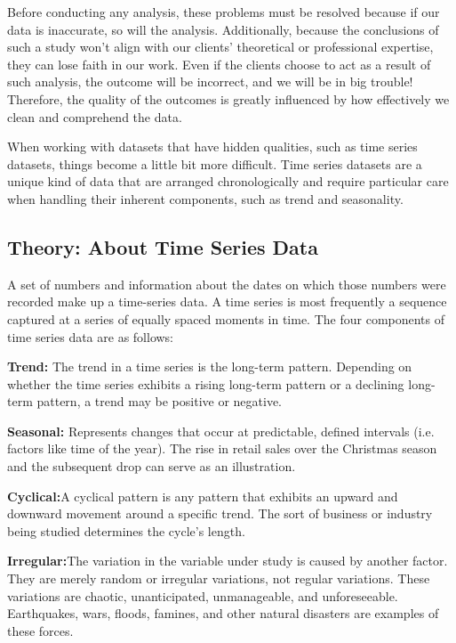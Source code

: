 Before conducting any analysis, these problems must be resolved because if our data is inaccurate, so will the analysis. Additionally, because the conclusions of such a study won't align with our clients' theoretical or professional expertise, they can lose faith in our work. Even if the clients choose to act as a result of such analysis, the outcome will be incorrect, and we will be in big trouble! Therefore, the quality of the outcomes is greatly influenced by how effectively we clean and comprehend the data.

When working with datasets that have hidden qualities, such as time series datasets, things become a little bit more difficult. Time series datasets are a unique kind of data that are arranged chronologically and require particular care when handling their inherent components, such as trend and seasonality.

\subsection{Theory: About Time Series Data}

\hspace{10mm}A set of numbers and information about the dates on which those numbers were recorded make up a time-series data. A time series is most frequently a sequence captured at a series of equally spaced moments in time. The four components of time series data are as follows:

\textbf{Trend:} The trend in a time series is the long-term pattern. Depending on whether the time series exhibits a rising long-term pattern or a declining long-term pattern, a trend may be positive or negative.

\textbf{Seasonal:} Represents changes that occur at predictable, defined intervals (i.e. factors like time of the year). The rise in retail sales over the Christmas season and the subsequent drop can serve as an illustration.


\textbf{Cyclical:}A cyclical pattern is any pattern that exhibits an upward and downward movement around a specific trend. The sort of business or industry being studied determines the cycle's length.


\textbf{Irregular:}The variation in the variable under study is caused by another factor. They are merely random or irregular variations, not regular variations. These variations are chaotic, unanticipated, unmanageable, and unforeseeable. Earthquakes, wars, floods, famines, and other natural disasters are examples of these forces.


